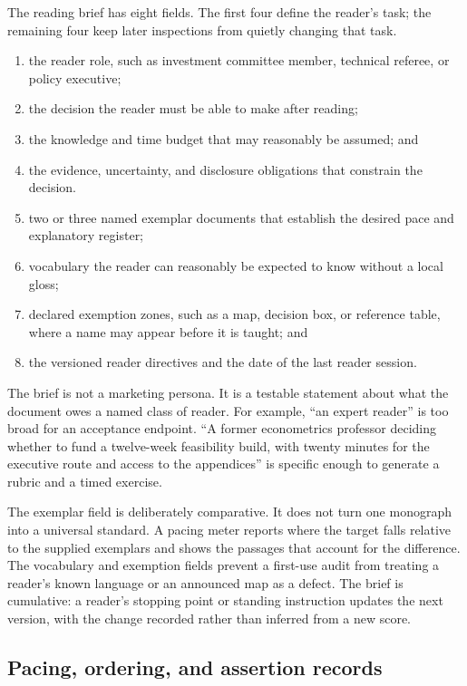 The reading brief has eight fields. The first four define the reader's task;
the remaining four keep later inspections from quietly changing that task.

\begin{enumerate}
\item the reader role, such as investment committee member, technical
      referee, or policy executive;
\item the decision the reader must be able to make after reading;
\item the knowledge and time budget that may reasonably be assumed; and
\item the evidence, uncertainty, and disclosure obligations that constrain
      the decision.
\item two or three named exemplar documents that establish the desired pace
      and explanatory register;
\item vocabulary the reader can reasonably be expected to know without a
      local gloss;
\item declared exemption zones, such as a map, decision box, or reference
      table, where a name may appear before it is taught; and
\item the versioned reader directives and the date of the last reader
      session.
\end{enumerate}

The brief is not a marketing persona. It is a testable statement about
what the document owes a named class of reader. For example, ``an expert
reader'' is too broad for an acceptance endpoint. ``A former econometrics
professor deciding whether to fund a twelve-week feasibility build,
with twenty minutes for the executive route and access to the appendices'' is
specific enough to generate a rubric and a timed exercise.

The exemplar field is deliberately comparative. It does not turn one
monograph into a universal standard. A pacing meter reports where the target
falls relative to the supplied exemplars and shows the passages that account
for the difference. The vocabulary and exemption fields prevent a first-use
audit from treating a reader's known language or an announced map as a defect.
The brief is cumulative: a reader's stopping point or standing instruction
updates the next version, with the change recorded rather than inferred from a
new score.

\subsection{Pacing, ordering, and assertion records}
\label{app:pacing-records}

